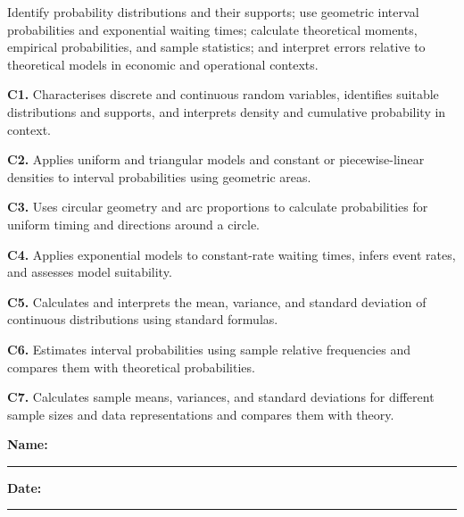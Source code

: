 \LearningObjective
{Identify probability distributions and their supports; use geometric interval probabilities and exponential waiting times; calculate theoretical moments, empirical probabilities, and sample statistics; and interpret errors relative to theoretical models in economic and operational contexts.}
{	\footnotesize
	\textbf{C1.} Characterises discrete and continuous random variables, identifies suitable distributions and supports, and interprets density and cumulative probability in context.\par
	\textbf{C2.} Applies uniform and triangular models and constant or piecewise-linear densities to interval probabilities using geometric areas.\par
	\textbf{C3.} Uses circular geometry and arc proportions to calculate probabilities for uniform timing and directions around a circle.\par
	\textbf{C4.} Applies exponential models to constant-rate waiting times, infers event rates, and assesses model suitability.\par
	\textbf{C5.} Calculates and interprets the mean, variance, and standard deviation of continuous distributions using standard formulas.\par
	\textbf{C6.} Estimates interval probabilities using sample relative frequencies and compares them with theoretical probabilities.\par
	\textbf{C7.} Calculates sample means, variances, and standard deviations for different sample sizes and data representations and compares them with theory.
}

\textbf{Name:} \rule{10cm}{0.4pt}\hfill\textbf{Date:} \rule{3cm}{0.4pt}
\vspace{-4mm}

